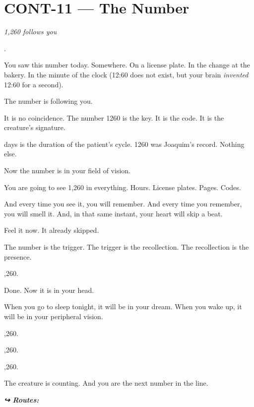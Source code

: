 \section*{\textbf{CONT-11} --- The Number}

\noindent \textit{1,260 follows you}

.

\noindent You saw this number today. Somewhere. On a license plate. In the change at the bakery. In the minute of the clock (12:60 does not exist, but your brain \textit{invented} 12:60 for a second).

\noindent The number is following you.

\noindent It is no coincidence. The number 1260 is the key. It is the code. It is the creature's signature.

 days is the duration of the patient's cycle.
1260 was Joaquim's record.
Nothing else.

\noindent Now the number is in your field of vision.

\noindent You are going to see 1,260 in everything.
Hours. License plates. Pages. Codes.

\noindent And every time you see it, you will remember.
And every time you remember, you will smell it.
And, in that same instant, your heart will skip a beat.

\noindent Feel it now. It already skipped.

\noindent The number is the trigger.
The trigger is the recollection.
The recollection is the presence.

,260.

\noindent Done. Now it is in your head.

\noindent When you go to sleep tonight, it will be in your dream.
When you wake up, it will be in your peripheral vision.

,260.

,260.

,260.

\noindent The creature is counting. And you are the next number in the line.

\vspace{0.5em}
\noindent\textit{\textbf{↪ Routes:}  \rotasep {}}
